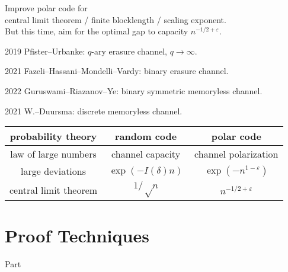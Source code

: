\documentclass[12pt, aspectratio=1610]{beamer}
\begin{document}
\begin{frame}
	Improve polar code for \\
	central limit theorem / finite blocklength / scaling exponent. \\
	But this time, aim for the optimal gap to capacity $n^{-1/2+ε}$.

	\pause

	2019 Pfister--Urbanke: $q$-ary erasure channel, $q → ∞$.

	\pause

	2021 Fazeli--Hassani--Mondelli--Vardy: binary erasure channel.

	\pause

	2022 Guruswami--Riazanov--Ye: binary symmetric memoryless channel.

	\pause

	2021 W.--Duursma: discrete memoryless channel.
\end{frame}

\begin{frame}
	\centering
	\def\arraystretch{1.5}
	\def\A{\color{alerted text.fg}}
	\def\E{\color{example text.fg}}
	\begin{tabular}{ccc}
		\toprule
		probability theory    & random code        & polar code           \\
		\midrule
		law of large numbers  & ~channel capacity~ & channel polarization \\
		large deviations      & $\exp(-I(δ)n)$     & \A $\exp(-n^{1-ε})$  \\
		central limit theorem & $1/√n$             & \E $n^{-1/2+ε}$      \\
		\bottomrule
	\end{tabular}
\end{frame}

\part{Proof Techniques}


\begin{frame}
	\centering
	Part \insertromanpartnumber
	
	\color{structure.fg}
	\insertpart
\end{frame}
\end{document}
